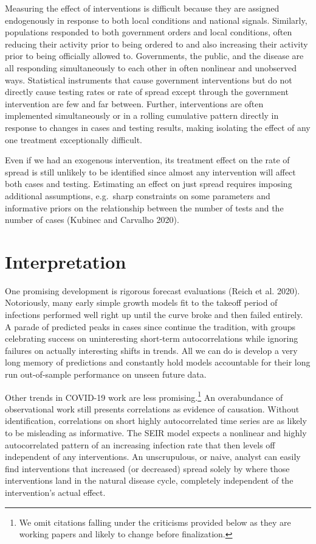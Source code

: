 \documentclass[10pt,letterpaper]{article}
\begin{document}
Measuring the effect of interventions is difficult because they are
assigned endogenously in response to both local conditions and national
signals. Similarly, populations responded to both government orders and
local conditions, often reducing their activity prior to being ordered
to and also increasing their activity prior to being officially allowed
to. Governments, the public, and the disease are all responding
simultaneously to each other in often nonlinear and unobserved ways.
Statistical instruments that cause government interventions but do not
directly cause testing rates or rate of spread except through the
government intervention are few and far between. Further, interventions
are often implemented simultaneously or in a rolling cumulative pattern
directly in response to changes in cases and testing results, making
isolating the effect of any one treatment exceptionally difficult.

Even if we had an exogenous intervention, its treatment effect on the
rate of spread is still unlikely to be identified since almost any
intervention will affect both cases and testing. Estimating an effect on
just spread requires imposing additional assumptions, e.g.~sharp
constraints on some parameters and informative priors on the
relationship between the number of tests and the number of cases
(Kubinec and Carvalho 2020).

\hypertarget{interpretation}{%
\section{Interpretation}\label{interpretation}}

One promising development is rigorous forecast evaluations (Reich et al.
2020). Notoriously, many early simple growth models fit to the takeoff
period of infections performed well right up until the curve broke and
then failed entirely. A parade of predicted peaks in cases since
continue the tradition, with groups celebrating success on uninteresting
short-term autocorrelations while ignoring failures on actually
interesting shifts in trends. All we can do is develop a very long
memory of predictions and constantly hold models accountable for their
long run out-of-sample performance on unseen future data.

Other trends in COVID-19 work are less promising.\footnote{We omit
  citations falling under the criticisms provided below as they are
  working papers and likely to change before finalization.} An
overabundance of observational work still presents correlations as
evidence of causation. Without identification, correlations on short
highly autocorrelated time series are as likely to be misleading as
informative. The SEIR model expects a nonlinear and highly
autocorrelated pattern of an increasing infection rate that then levels
off independent of any interventions. An unscrupulous, or naive, analyst
can easily find interventions that increased (or decreased) spread
solely by where those interventions land in the natural disease cycle,
completely independent of the intervention's actual effect.
\end{document}
